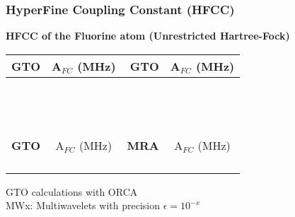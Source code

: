 \begin{frame}
\frametitle{HyperFine Coupling Constant (HFCC)}
\centering
\scriptsize
\textbf{HFCC of the Fluorine atom (Unrestricted Hartree-Fock)}
\begin{table}
\begin{tabular}{rrrr}
\hline
\hline
\multicolumn{1}{r}{\textbf{GTO}}&
\multicolumn{1}{c}{A$_{FC}$ (MHz)}&
\multicolumn{1}{r}{\textbf{GTO}}&
\multicolumn{1}{c}{A$_{FC}$ (MHz)}\\
\hline
               &                &                &                \\
               &                &                &                \\
               &                &                &                \\
               &                &                &                \\
\hline
\hline
\hspace{15mm}\ & \hspace{15mm}\ & \hspace{25mm}\ & \hspace{15mm}\ \\
\hspace{15mm}\ & \hspace{15mm}\ & \hspace{25mm}\ & \hspace{15mm}\ \\
\hline
\hline
\multicolumn{1}{r}{\textbf{GTO}}&
\multicolumn{1}{c}{A$_{FC}$ (MHz)}&
\multicolumn{1}{r}{\textbf{MRA}}&
\multicolumn{1}{c}{A$_{FC}$ (MHz)}\\
\hline
                &                &               &                \\
                &                &               &                \\
                &                &               &                \\
                &                &               &                \\
\hline
\hline
\end{tabular}
\end{table}
\tiny
GTO calculations with ORCA\\
MWx: Multiwavelets with precision $\epsilon=10^{-x}$
\end{frame}


